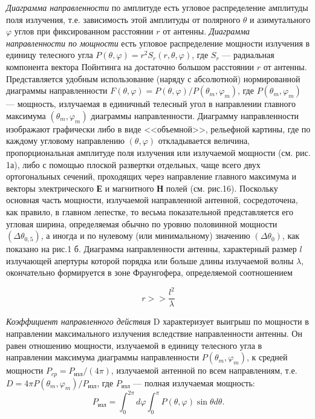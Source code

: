 \textit{Диаграмма направленности} по амплитуде есть угловое распределение амплитуды поля излучения, т.е. зависимость этой
амплитуды от полярного $\theta $ и азимутального $ \varphi $ углов при фиксированном расстоянии $r$ от антенны. \textit{Диаграмма направленности
по мощности} есть угловое распределение мощности излучения в единицу телесного угла $P(\theta, \varphi)=r^{2} S_{r}(r, \theta, \varphi)$,
где $S_{r}$ — радиальная компонента вектора Пойнтинга на достаточно большом расстоянии $r$ от антенны. Представляется 
удобным использование (наряду с абсолютной) нормированной диаграммы направленности $F(\theta,\varphi) = P(\theta,\varphi)/P(\theta_m,\varphi_m)$,
где $P(\theta_m,\varphi_m)$ — мощность, излучаемая в единичный телесный угол в направлении главного максимума $(\theta_m,\varphi_m)$ диаграммы
направленности. Диаграмму направленности изображают графически либо в виде <<объемной>>, рельефной картины, где по
каждому угловому направлению $(\theta,\varphi)$ откладывается величина, пропорциональная амплитуде поля излучения или излучаемой 
мощности (см. рис. 1а), либо с помощью плоской развертки отдельных, чаще всего двух ортогональных сечений, проходящих 
через направление главного максимума и векторы электрического \textbf{Е} и магнитного \textbf{Н} полей (см. рис.16). Поскольку основная
часть мощности, излучаемой направленной антенной, сосредоточена, как правило, в главном лепестке, то весьма показательной
представляется его угловая ширина, определяемая обычно по уровню половинной мощности $ \left(\Delta \theta_{0,5}\right) $, а иногда и по нулевому (или минимальному) значению
$ \left(\Delta \theta_{0}\right) $, как показано на рис.1 б. Диаграмма направленности антенны, характерный размер $l$
излучающей апертуры которой порядка или больше длины излучаемой волны $\lambda$, окончательно формируется в зоне Фраунгофера,
определяемой соотношением 

\begin{equation}
    r>>\frac{l^2}{\lambda}
    \label{eq:1}
\end{equation}

\textit{Коэффициент направленного действия} D характеризует
выигрыш по  мощности в направлении максимального излучения вследствие направленности антенны. Он равен отношению 
мощности, излучаемой в единицу телесного угла в направлении максимума диаграммы направленности $P(\theta_m,\varphi_m)$, к средней 
мощности $P_{cp} = P_{\text{изл}} /(4\pi)$, излучаемой антенной по всем направлениям, т.е. $ D=4 \pi
P\left(\theta_{m}, \varphi_{m}\right) / P_{\text{изл}} $, где $P_{\text{изл}} $ — полная излучаемая мощность:
$$  P_{\text{изл}} = \int_0^{2\pi}d\varphi \int_0^\pi P( \theta,\varphi ) \sin{\theta}d \theta. $$

